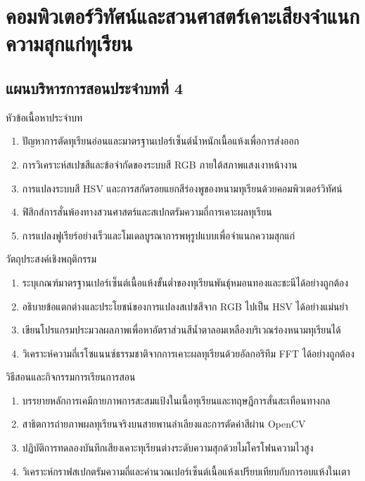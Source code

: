 \chapter{คอมพิวเตอร์วิทัศน์และสวนศาสตร์เคาะเสียงจำแนกความสุกแก่ทุเรียน}
\label{chap:ch04}

\section*{แผนบริหารการสอนประจำบทที่ 4}

\begin{planbox}{หัวข้อเนื้อหาประจำบท}
\begin{enumerate}[topsep=2pt, itemsep=1pt, partopsep=0pt, parsep=0pt, leftmargin=1.5em]
    \item ปัญหาการตัดทุเรียนอ่อนและมาตรฐานเปอร์เซ็นต์น้ำหนักเนื้อแห้งเพื่อการส่งออก
    \item การวิเคราะห์สเปซสีและข้อจำกัดของระบบสี RGB ภายใต้สภาพแสงเงาหน้างาน
    \item การแปลงระบบสี HSV และการสกัดรอยแยกสีร่องพูของหนามทุเรียนด้วยคอมพิวเตอร์วิทัศน์
    \item ฟิสิกส์การสั่นพ้องทางสวนศาสตร์และสเปกตรัมความถี่การเคาะผลทุเรียน
    \item การแปลงฟูเรียร์อย่างเร็วและโมเดลบูรณาการพหุรูปแบบเพื่อจำแนกความสุกแก่
\end{enumerate}
\end{planbox}

\begin{planbox}{วัตถุประสงค์เชิงพฤติกรรม}
\begin{enumerate}[topsep=2pt, itemsep=1pt, partopsep=0pt, parsep=0pt, leftmargin=1.5em]
    \item ระบุเกณฑ์มาตรฐานเปอร์เซ็นต์เนื้อแห้งขั้นต่ำของทุเรียนพันธุ์หมอนทองและชะนีได้อย่างถูกต้อง
    \item อธิบายข้อแตกต่างและประโยชน์ของการแปลงสเปซสีจาก RGB ไปเป็น HSV ได้อย่างแม่นยำ
    \item เขียนโปรแกรมประมวลผลภาพเพื่อหาอัตราส่วนสีน้ำตาลอมเหลืองบริเวณร่องหนามทุเรียนได้
    \item วิเคราะห์ความถี่เรโซแนนซ์ธรรมชาติจากการเคาะผลทุเรียนด้วยอัลกอริทึม FFT ได้อย่างถูกต้อง
\end{enumerate}
\end{planbox}

\newpage

\begin{planbox}{วิธีสอนและกิจกรรมการเรียนการสอน}
\begin{enumerate}[topsep=2pt, itemsep=1pt, partopsep=0pt, parsep=0pt, leftmargin=1.5em]
    \item บรรยายหลักการเคมีกายภาพการสะสมแป้งในเนื้อทุเรียนและทฤษฎีการสั่นสะเทือนทางกล
    \item สาธิตการถ่ายภาพผลทุเรียนจริงบนสายพานลำเลียงและการตัดค่าสีผ่าน OpenCV
    \item ปฏิบัติการทดลองบันทึกเสียงเคาะทุเรียนต่างระดับความสุกด้วยไมโครโฟนความไวสูง
    \item วิเคราะห์กราฟสเปกตรัมความถี่และคำนวณเปอร์เซ็นต์เนื้อแห้งเปรียบเทียบกับการอบแห้งในเตา
\end{enumerate}
\end{planbox}

